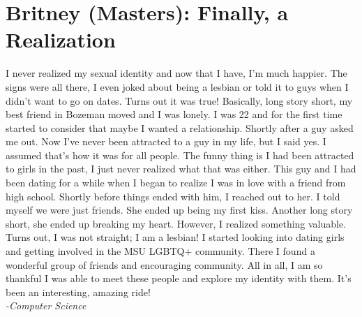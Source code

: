 \section*{Britney (Masters): Finally, a Realization}
I never realized my sexual identity and now that I have, I’m much happier. 
The signs were all there, I even joked about being a lesbian or told it to 
guys when I didn’t want to go on dates. Turns out it was true! Basically, long 
story short, my best friend in Bozeman moved and I was lonely. I was 22 and for
the first time started to consider that maybe I wanted a relationship. Shortly 
after a guy asked me out. Now I’ve never been attracted to a guy in my life, 
but I said yes. I assumed that’s how it was for all people. The funny thing is 
I had been attracted to girls in the past, I just never realized what that was 
either. This guy and I had been dating for a while when I began to realize I 
was in love with a friend from high school. Shortly before things ended with 
him, I reached out to her. I told myself we were just friends. She ended up 
being my first kiss. Another long story short, she ended up breaking my heart. 
However, I realized something valuable. Turns out, I was not straight; I am a 
lesbian! I started looking into dating girls and getting involved in the MSU 
LGBTQ+ community. There I found a wonderful group of friends and encouraging 
community. All in all, I am so thankful I was able to meet these people and 
explore my identity with them. It’s been an interesting, amazing ride! \\
\textit{-Computer Science}
